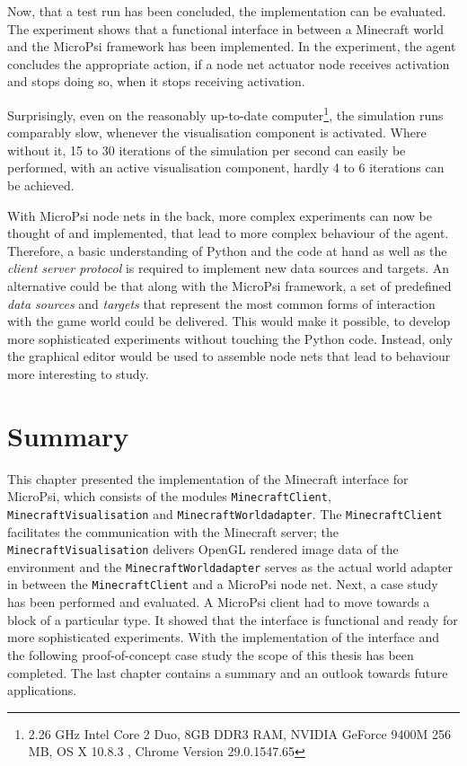         
Now, that a test run has been concluded, the implementation can be evaluated.
The experiment shows that a functional interface in between a Minecraft world and the MicroPsi framework has been implemented. In the experiment, the agent concludes the appropriate action, if a node net actuator node receives activation and stops doing so, when it stops receiving activation.

Surprisingly, even on the reasonably up-to-date computer\footnote{2.26 GHz Intel Core 2 Duo, 8GB DDR3 RAM, NVIDIA GeForce 9400M 256 MB, OS X 10.8.3 , Chrome Version 29.0.1547.65}, the simulation runs comparably slow, whenever the visualisation component is activated. Where without it, 15 to 30 iterations of the simulation per second can easily be performed, with an active visualisation component, hardly 4 to 6 iterations can be achieved.


With MicroPsi node nets in the back, more complex experiments can now be thought of and implemented, that lead to more complex behaviour of the agent. Therefore, a basic understanding of Python and the code at hand as well as the \emph{client server protocol} is required to implement new data sources and targets. An alternative could be that along with the MicroPsi framework, a set of predefined \emph{data sources} and \emph{targets} that represent the most common forms of interaction with the game world could be delivered. This would make it possible, to develop more sophisticated experiments without touching the Python code. Instead, only the graphical editor would be used to assemble node nets that lead to behaviour more interesting to study.

    \section{Summary}
This chapter presented the implementation of the Minecraft interface for MicroPsi, which consists of the modules \texttt{MinecraftClient}, \texttt{MinecraftVisualisation} and \texttt{MinecraftWorldadapter}. The \texttt{MinecraftClient} facilitates the communication with the Minecraft server; the \texttt{MinecraftVisualisation} delivers OpenGL rendered image data of the environment and the \texttt{MinecraftWorldadapter} serves as the actual world adapter in between the \texttt{MinecraftClient} and a MicroPsi node net.
Next, a case study has been performed and evaluated. A MicroPsi client had to move towards a block of a particular type. It showed that the interface is functional and ready for more sophisticated experiments.
With the implementation of the interface and the following proof-of-concept case study the scope of this thesis has been completed. The last chapter contains a summary and an outlook towards future applications.